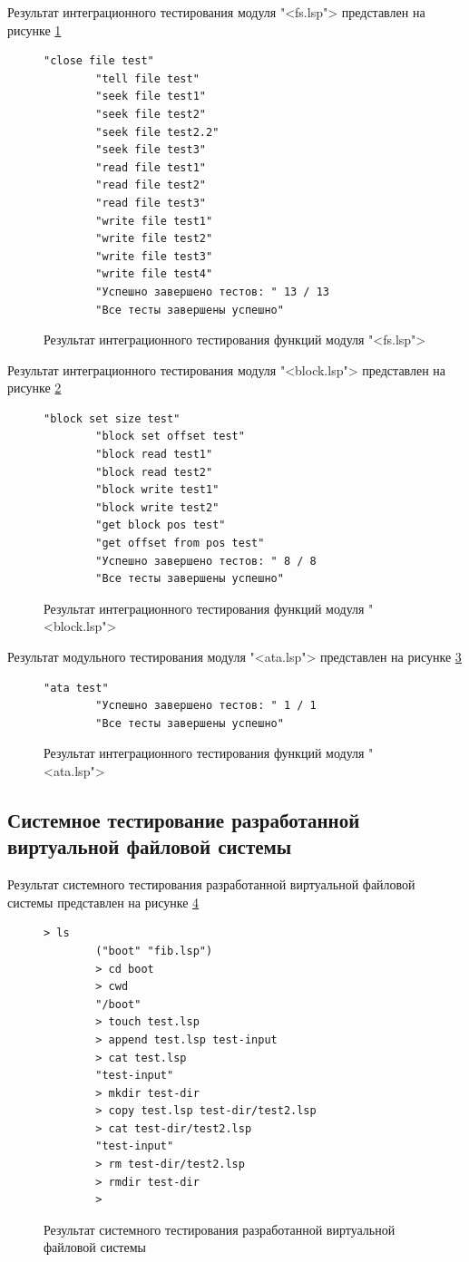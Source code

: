 Результат интеграционного тестирования модуля "<fs.lsp"> представлен на рисунке \ref{unitVFS:image}

\begin{figure}[H]
	\begin{lstlisting}[language={}]
		"close file test"
		"tell file test"
		"seek file test1"
		"seek file test2"
		"seek file test2.2"
		"seek file test3"
		"read file test1"
		"read file test2"
		"read file test3"
		"write file test1"
		"write file test2"
		"write file test3"
		"write file test4"
		"Успешно завершено тестов: " 13 / 13
		"Все тесты завершены успешно"
	\end{lstlisting}  
	\caption{Результат интеграционного тестирования функций модуля "<fs.lsp">}
	\label{unitVFS:image}
\end{figure}

Результат интеграционного тестирования модуля "<block.lsp"> представлен на рисунке \ref{unitBlock:image}

\begin{figure}[H]
	\begin{lstlisting}[language={}]
		"block set size test"
		"block set offset test"
		"block read test1"
		"block read test2"
		"block write test1"
		"block write test2"
		"get block pos test"
		"get offset from pos test"
		"Успешно завершено тестов: " 8 / 8
		"Все тесты завершены успешно"
	\end{lstlisting}  
	\caption{Результат интеграционного тестирования функций модуля "<block.lsp">}
	\label{unitBlock:image}
\end{figure}

Результат модульного тестирования модуля "<ata.lsp"> представлен на рисунке \ref{unitATA:image}

\begin{figure}[H]
	\begin{lstlisting}[language={}]
		"ata test"
		"Успешно завершено тестов: " 1 / 1
		"Все тесты завершены успешно"
	\end{lstlisting}  
	\caption{Результат интеграционного тестирования функций модуля "<ata.lsp">}
	\label{unitATA:image}
\end{figure}

\subsection{Системное тестирование разработанной виртуальной файловой системы}

Результат системного тестирования разработанной виртуальной файловой системы представлен на рисунке \ref{systemTest:image}

\begin{figure}[H]
	\begin{lstlisting}[language={}]
		> ls
		("boot" "fib.lsp")
		> cd boot
		> cwd
		"/boot"
		> touch test.lsp
		> append test.lsp test-input
		> cat test.lsp
		"test-input"
		> mkdir test-dir
		> copy test.lsp test-dir/test2.lsp
		> cat test-dir/test2.lsp
		"test-input"
		> rm test-dir/test2.lsp
		> rmdir test-dir
		> 
	\end{lstlisting}  
	\caption{Результат системного тестирования разработанной виртуальной файловой системы}
	\label{systemTest:image}
\end{figure}
